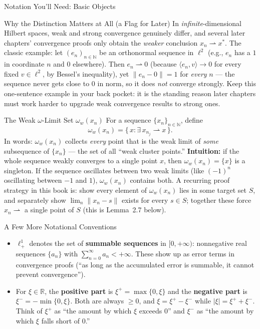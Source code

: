 \documentclass[aspectratio=169,10pt]{beamer}
\newcommand{\R}{\mathbb{R}}
\newcommand{\wto}{\rightharpoonup}
\begin{document}
\begin{frame}[allowframebreaks]{Notation You'll Need: Basic Objects}
  \framebreak

  \begin{alertblock}{Why the Distinction Matters at All (a Flag for Later)}
    In \emph{infinite}-dimensional Hilbert spaces, weak and strong convergence
    genuinely differ, and several later chapters' convergence proofs only
    obtain the \emph{weaker} conclusion $x_n \wto x^*$. The classic example:
    let $(e_n)_{n \in \mathbb{N}}$ be an orthonormal sequence in
    $\ell^2$ (e.g., $e_n$ has a $1$ in coordinate $n$ and $0$ elsewhere). Then
    $e_n \wto 0$ (because $\langle e_n, v \rangle \to 0$ for every fixed
    $v \in \ell^2$, by Bessel's inequality), yet $\|e_n - 0\| = 1$ for
    \emph{every} $n$ --- the sequence never gets close to $0$ in norm, so it
    does \emph{not} converge strongly. Keep this one-sentence example in your
    back pocket: it is the standing reason later chapters must work harder to
    upgrade weak convergence results to strong ones.
  \end{alertblock}

  \begin{block}{The Weak $\omega$-Limit Set $\omega_w(x_n)$}
    For a sequence $\{x_n\}_{n \in \mathbb{N}}$, define
    \[
      \omega_w(x_n) = \{\, x : \exists\, x_{n_j} \wto x \,\}.
    \]
    In words: $\omega_w(x_n)$ collects \emph{every} point that is the weak
    limit of \emph{some} subsequence of $\{x_n\}$ --- the set of all
    ``weak cluster points.'' \textbf{Intuition:} if the whole sequence
    weakly converges to a single point $x$, then $\omega_w(x_n) = \{x\}$
    is a singleton. If the sequence oscillates between two weak limits (like
    $(-1)^n$ oscillating between $-1$ and $1$), $\omega_w(x_n)$ contains both.
    A recurring proof strategy in this book is: show every element of
    $\omega_w(x_n)$ lies in some target set $S$, and separately show
    $\lim_n \|x_n - s\|$ exists for every $s \in S$; together these force
    $x_n \wto$ a single point of $S$ (this is Lemma~2.7 below).
  \end{block}

  \framebreak

  \begin{block}{A Few More Notational Conventions}
    \begin{itemize}
      \item $\ell^1_+$ denotes the set of \textbf{summable sequences} in
        $[0, +\infty)$: nonnegative real sequences $\{a_n\}$ with
        $\sum_{n=0}^{\infty} a_n < +\infty$. These show up as error terms in
        convergence proofs (``as long as the accumulated error is
        summable, it cannot prevent convergence'').
      \item For $\xi \in \R$, the \textbf{positive part} is
        $\xi^+ = \max\{0, \xi\}$ and the \textbf{negative part} is
        $\xi^- = -\min\{0, \xi\}$. Both are always $\ge 0$, and
        $\xi = \xi^+ - \xi^-$ while $|\xi| = \xi^+ + \xi^-$. Think of
        $\xi^+$ as ``the amount by which $\xi$ exceeds $0$'' and $\xi^-$ as
        ``the amount by which $\xi$ falls short of $0$.''
    \end{itemize}
  \end{block}


\end{frame}
\end{document}
